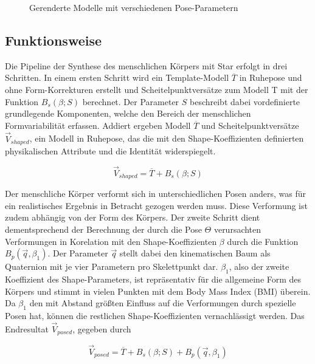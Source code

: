 \begin{figure}[H]
  \centering 
   \qquad 
  \caption{Gerenderte Modelle mit verschiedenen Pose-Parametern} 
  \label{fig:poses}
\end{figure}

\subsection{Funktionsweise}

Die Pipeline der Synthese des menschlichen Körpers mit Star erfolgt in drei Schritten. In einem ersten Schritt wird ein
Template-Modell $\overline{T}$ in Ruhepose und ohne Form-Korrekturen erstellt und Scheitelpunktversätze zum Modell T mit der Funktion
$B_s(\beta;S)$ berechnet. Der Parameter $S$ beschreibt dabei vordefinierte grundlegende Komponenten, welche den Bereich der
menschlichen Formvariabilität erfassen. Addiert ergeben Modell $\overline{T}$ und Scheitelpunktversätze
$\vec{V}_{shaped}$, ein Modell in Ruhepose,
das die mit den Shape-Koeffizienten definierten physikalischen Attribute und die Identität widerspiegelt.

\begin{equation}\label{eq:Star_Vshaped}
  \vec{V}_{shaped}=\overline{T}+B_s(\beta;S)
\end{equation}

Der menschliche Körper verformt sich in unterschiedlichen Posen anders, was für ein realistisches Ergebnis in Betracht
gezogen werden muss. Diese Verformung ist zudem abhängig von der Form des Körpers. Der zweite Schritt dient dementsprechend der
Berechnung der durch die Pose $\Theta$ verursachten Verformungen in Korelation mit den Shape-Koeffizienten $\beta$ durch die Funktion
$B_p(\vec{q},\beta _1) $. Der Parameter $\vec{q}$ stellt dabei den kinematischen Baum als Quaternion mit je vier
Parametern pro Skelettpunkt dar. $\beta _1$, also der
zweite Koeffizient des Shape-Parameters, ist repräsentativ für die allgemeine Form des Körpers und stimmt in vielen
Punkten mit dem Body Mass Index (BMI) überein. Da $\beta _1$ den mit Abstand größten Einfluss auf die Verformungen durch
spezielle Posen hat, können die restlichen Shape-Koeffizienten vernachlässigt werden. Das Endresultat $\vec{V}_{posed}$, gegeben
durch

\begin{equation}\label{eq:Star_Vposed}
  \vec{V}_{posed}=\overline{T}+B_s(\beta;S)+B_p(\vec{q},\beta _1)
\end{equation}

